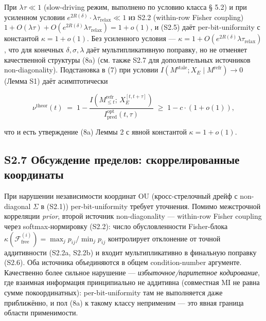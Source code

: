 \documentclass[pdflatex,sn-mathphys-ay]{sn-jnl}
\begin{document}
При \(\lambda \tau \ll 1\) (slow-driving режим, выполнено по условию класса § 5.2) и при усиленном условии \(e^{2R(\delta)} \cdot \lambda \tau_{\text{relax}} \ll 1\) из S2.2 (within-row Fisher coupling) \(1 + O(\lambda \tau) + O(e^{2R(\delta)} \lambda \tau_{\text{relax}}) = 1 + o(1)\), и (S2.5) даёт per-bit-uniformity с константой \(\kappa = 1 + o(1)\). Без усиленного условия --- \(\kappa = 1 + O(e^{2R(\delta)} \lambda \tau_{\text{relax}})\), что для конечных \(\delta, \sigma, \lambda\) даёт мультипликативную поправку, но не отменяет качественной структуры (8a) (см. также S2.7 для дополнительных источников non-diagonality). Подстановка в (7) при условии \(I(M^{\text{stale}}; X_E \mid M^{\text{refr}}) \to 0\) (Лемма S1) даёт асимптотически



\begin{equation}\nu^{\text{theor}}(t) \;=\; 1 - \frac{I(M_{\le t}^{\text{refr}};\, X_E^{[t, t+\tau]})}{I_{\text{pred}}^{\text{opt}}(t, \tau)} \;\ge\; 1 - c \cdot (1 + o(1)), \tag{S2.6}\end{equation}



что и есть утверждение (8a) Леммы 2 с явной константой \(\kappa = 1 + o(1)\).



\subsection*{S2.7 Обсуждение пределов: скоррелированные координаты}\label{s2.7-ux43eux431ux441ux443ux436ux434ux435ux43dux438ux435-ux43fux440ux435ux434ux435ux43bux43eux432-ux441ux43aux43eux440ux440ux435ux43bux438ux440ux43eux432ux430ux43dux43dux44bux435-ux43aux43eux43eux440ux434ux438ux43dux430ux442ux44b}



При нарушении независимости координат OU (кросс-стрелочный дрейф с non-diagonal \(\Sigma\) в (S2.1)) per-bit-uniformity требует уточнения. Помимо межстрочной корреляции \emph{prior}, второй источник non-diagonality --- within-row Fisher coupling через softmax-нормировку (S2.2): число обусловленности Fisher-блока \(\kappa(\mathcal{F}^{(i)}_{\text{free}}) = \max_j p_{ij} / \min_j p_{ij}\) контролирует отклонение от точной аддитивности (S2.2a, S2.2b) и входит мультипликативно в финальную поправку (S2.6). Оба источника объединяются в общем condition-number аргументе. Качественно более сильное нарушение --- \emph{избыточное/паритетное кодирование}, где взаимная информация принципиально не аддитивна (совместная MI не равна сумме покоординатных): per-bit-uniformity там не выполняется даже приближённо, и пол (8a) к такому классу неприменим --- это явная граница области применимости.
\end{document}
